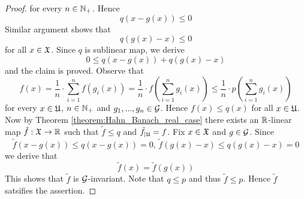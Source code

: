 \begin{proof}
for every $n\in {\mathbb N}_+$. Hence 
$$q\left(x - g(x)\right) \leq 0$$
Similar argument shows that
$$q\left(g(x) - x\right) \leq 0$$
for all $x \in {\mathfrak X}$. Since $q$ is sublinear map, we derive 
$$0 \leq q\left(x - g(x)\right) + q\left(g(x) - x\right)$$
and the claim is proved. Observe that
$$f(x) = \frac{1}{n}\cdot \sum_{i=1}^nf\left(g_i(x)\right) = \frac{1}{n}\cdot f\left(\sum_{i=1}^ng_i(x)\right) \leq \frac{1}{n}\cdot p\left(\sum_{i=1}^ng_i(x)\right)$$
for every $x \in {\mathfrak U}$, $n\in {\mathbb N}_+$ and $g_1,...,g_n\in {\mathcal G}$. Hence $f(x) \leq q(x)$ for all $x\in {\mathfrak U}$. Now by Theorem \ref{theorem:Hahn_Banach_real_case} there exists an ${\mathbb R}$-linear map $\tilde{f}:{\mathfrak X}\rightarrow {\mathbb R}$ such that $\tilde{f} \leq q$ and $\tilde{f}_{\mid {\mathfrak U}} = f$. Fix $x \in {\mathfrak X}$ and $g \in {\mathcal G}$. Since
$$\tilde{f}\left(x - g(x)\right) \leq q\left(x - g(x)\right) = 0,\,\tilde{f}\left(g(x) - x\right) \leq q\left(g(x) - x\right) = 0$$
we derive that
$$\tilde{f}(x) = \tilde{f}\left(g(x)\right)$$
This shows that $\tilde{f}$ is ${\mathcal G}$-invariant. Note that $q \leq p$ and thus $\tilde{f} \leq p$. Hence $\tilde{f}$ satsifies the assertion. 
\end{proof}













\small




